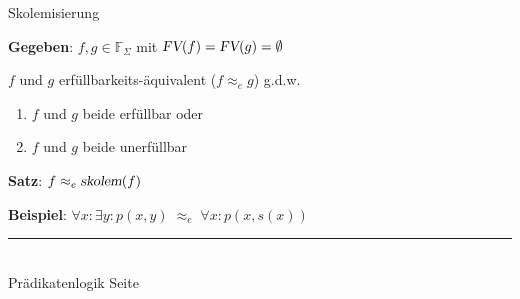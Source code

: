 \documentclass{slides}
\newcommand{\myrule}{\rule{20cm}{1mm}\\ }
\newcommand{\FV}{\textsl{FV}}
\newcounter{mypage}
\begin{document}
\begin{slide}{}
\normalsize
\begin{center}
Skolemisierung
\end{center}
\vspace{0.5cm}

\textbf{Gegeben}: $f,g \in \mathbb{F}_\Sigma$ \quad mit $\FV(f) = \FV(g) = \emptyset$

$f$ und $g$ erfüllbarkeits-äquivalent ($f \approx_e g$) \quad g.d.w.
\begin{enumerate}
\item $f$ und $g$ beide erfüllbar oder
\item $f$ und $g$ beide unerfüllbar
\end{enumerate}

\textbf{Satz}: $f \approx_e \textsl{skolem}(f)$

\textbf{Beispiel}: $\forall x: \exists y: p(x,y) \;\approx_e\; \forall x: p(x,s(x))$

\vspace*{\fill}
\tiny \addtocounter{mypage}{1}
\myrule
Prädikatenlogik   \hspace*{\fill} Seite 
\end{slide}


\end{document}
